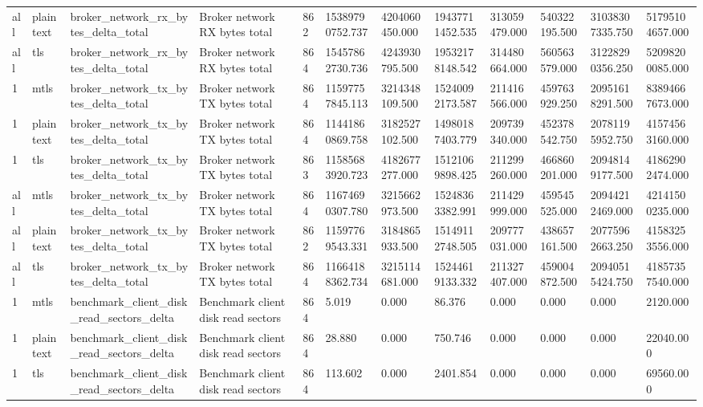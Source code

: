 \begin{longtable}{llllllllllll}
all & plaintext & broker\_network\_rx\_bytes\_delta\_total & Broker network RX bytes total & 862 & 15389790752.737 & 4204060450.000 & 19437711452.535 & 313059479.000 & 540322195.500 & 31038307335.750 & 51795104657.000 \\
all & tls & broker\_network\_rx\_bytes\_delta\_total & Broker network RX bytes total & 864 & 15457862730.736 & 4243930795.500 & 19532178148.542 & 314480664.000 & 560563579.000 & 31228290356.250 & 52098200085.000 \\
1 & mtls & broker\_network\_tx\_bytes\_delta\_total & Broker network TX bytes total & 864 & 11597757845.113 & 3214348109.500 & 15240092173.587 & 211416566.000 & 459763929.250 & 20951618291.500 & 83894667673.000 \\
1 & plaintext & broker\_network\_tx\_bytes\_delta\_total & Broker network TX bytes total & 864 & 11441860869.758 & 3182527102.500 & 14980187403.779 & 209739340.000 & 452378542.750 & 20781195952.750 & 41574563160.000 \\
1 & tls & broker\_network\_tx\_bytes\_delta\_total & Broker network TX bytes total & 863 & 11585683920.723 & 4182677277.000 & 15121069898.425 & 211299260.000 & 466860201.000 & 20948149177.500 & 41862902474.000 \\
all & mtls & broker\_network\_tx\_bytes\_delta\_total & Broker network TX bytes total & 864 & 11674690307.780 & 3215662973.500 & 15248363382.991 & 211429999.000 & 459545525.000 & 20944212469.000 & 42141500235.000 \\
all & plaintext & broker\_network\_tx\_bytes\_delta\_total & Broker network TX bytes total & 862 & 11597769543.331 & 3184865933.500 & 15149112748.505 & 209777031.000 & 438657161.500 & 20775962663.250 & 41583253556.000 \\
all & tls & broker\_network\_tx\_bytes\_delta\_total & Broker network TX bytes total & 864 & 11664188362.734 & 3215114681.000 & 15244619133.332 & 211327407.000 & 459004872.500 & 20940515424.750 & 41857357540.000 \\
1 & mtls & benchmark\_client\_disk\_read\_sectors\_delta & Benchmark client disk read sectors & 864 & 5.019 & 0.000 & 86.376 & 0.000 & 0.000 & 0.000 & 2120.000 \\
1 & plaintext & benchmark\_client\_disk\_read\_sectors\_delta & Benchmark client disk read sectors & 864 & 28.880 & 0.000 & 750.746 & 0.000 & 0.000 & 0.000 & 22040.000 \\
1 & tls & benchmark\_client\_disk\_read\_sectors\_delta & Benchmark client disk read sectors & 864 & 113.602 & 0.000 & 2401.854 & 0.000 & 0.000 & 0.000 & 69560.000 \\

\end{longtable}
